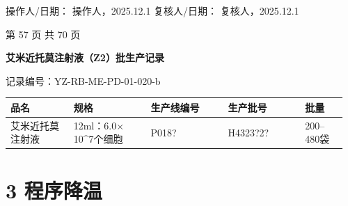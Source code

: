 \documentclass[UTF8,10pt,a4paper,fontset=fandol]{ctexart}
\newcommand{\fieldvalue}[1]{#1}
\newcommand{\handwritten}[1]{#1}
\begin{document}
\vspace{0.25em}

操作人/日期：
\fieldvalue{\handwritten{操作人，2025.12.1}}
\hfill
复核人/日期：
\fieldvalue{\handwritten{复核人，2025.12.1}}

\begin{center}
第 57 页 共 70 页
\end{center}


\newpage

\begin{center}
\textbf{艾米近托莫注射液（Z2）批生产记录}
\end{center}

\noindent
记录编号：YZ-RB-ME-PD-01-020-b

\begin{center}
\begin{tabular}{|p{0.18\linewidth}|p{0.22\linewidth}|p{0.22\linewidth}|p{0.22\linewidth}|p{0.12\linewidth}|}
\hline
\centering 品名 & \centering 规格 & \centering 生产线编号 & \centering 生产批号 & \centering 批量\\
\hline
\centering
\fieldvalue{艾米近托莫注射液}
&
\centering
\fieldvalue{12ml：6.0$\times$10^7个细胞}
&
\centering
\fieldvalue{\handwritten{P018?}}
&
\centering
\fieldvalue{\handwritten{H4323?2?}}
&
\centering
\fieldvalue{200--480袋}
\\
\hline
\end{tabular}
\end{center}

\section*{3 程序降温}
\end{document}
